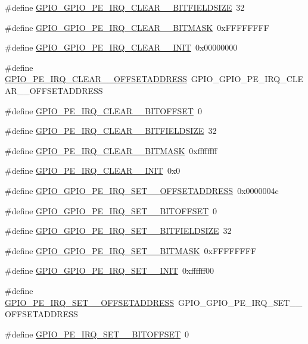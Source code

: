 \begin{DoxyCompactItemize}
\item 
\#define \hyperlink{a00553_a4c870e62898189fa92203f0682bbbe15}{GPIO\_\-GPIO\_\-PE\_\-IRQ\_\-CLEAR\_\_\-BITFIELDSIZE}~32
\item 
\#define \hyperlink{a00553_a793d4be1b9cbb0a63a60c5ee3d331065}{GPIO\_\-GPIO\_\-PE\_\-IRQ\_\-CLEAR\_\_\-BITMASK}~0xFFFFFFFF
\item 
\#define \hyperlink{a00553_af0caddaaadb1c9fd920fcbe4f42a7473}{GPIO\_\-GPIO\_\-PE\_\-IRQ\_\-CLEAR\_\_\-INIT}~0x00000000
\item 
\#define \hyperlink{a00553_a798229bf4e5ea0cc5f2be262d2c382d0}{GPIO\_\-PE\_\-IRQ\_\-CLEAR\_\_\-OFFSETADDRESS}~GPIO\_\-GPIO\_\-PE\_\-IRQ\_\-CLEAR\_\_\-OFFSETADDRESS
\item 
\#define \hyperlink{a00553_a2e8a8a33e6d9f1f2e9fec575e4bba0f7}{GPIO\_\-PE\_\-IRQ\_\-CLEAR\_\_\-BITOFFSET}~0
\item 
\#define \hyperlink{a00553_a4ac6e20dd0a129f61297428c6c927222}{GPIO\_\-PE\_\-IRQ\_\-CLEAR\_\_\-BITFIELDSIZE}~32
\item 
\#define \hyperlink{a00553_a22c7fca1e199d55d5dd87e368bc64a80}{GPIO\_\-PE\_\-IRQ\_\-CLEAR\_\_\-BITMASK}~0xffffffff
\item 
\#define \hyperlink{a00553_a157ca7bf58e28c816e92f3bb01b5f8e2}{GPIO\_\-PE\_\-IRQ\_\-CLEAR\_\_\-INIT}~0x0
\item 
\#define \hyperlink{a00553_a9157f2d5bf47dda85aeae4489ccd9413}{GPIO\_\-GPIO\_\-PE\_\-IRQ\_\-SET\_\_\-OFFSETADDRESS}~0x0000004c
\item 
\#define \hyperlink{a00553_a1e8be9676dc55a821f054b4a31d8fdb3}{GPIO\_\-GPIO\_\-PE\_\-IRQ\_\-SET\_\_\-BITOFFSET}~0
\item 
\#define \hyperlink{a00553_a4e96a3af7407cb3f1bc03dab1bf17b2f}{GPIO\_\-GPIO\_\-PE\_\-IRQ\_\-SET\_\_\-BITFIELDSIZE}~32
\item 
\#define \hyperlink{a00553_a40351041f556872478184a23025be5cc}{GPIO\_\-GPIO\_\-PE\_\-IRQ\_\-SET\_\_\-BITMASK}~0xFFFFFFFF
\item 
\#define \hyperlink{a00553_a9147f771ef88db18ec6530a57b8a6ebb}{GPIO\_\-GPIO\_\-PE\_\-IRQ\_\-SET\_\_\-INIT}~0xffffff00
\item 
\#define \hyperlink{a00553_a67d47283d969b2660f85e7921aa9d965}{GPIO\_\-PE\_\-IRQ\_\-SET\_\_\-OFFSETADDRESS}~GPIO\_\-GPIO\_\-PE\_\-IRQ\_\-SET\_\_\-OFFSETADDRESS
\item 
\#define \hyperlink{a00553_ad5ba0d946b7a6cf2e79abae9ef29823e}{GPIO\_\-PE\_\-IRQ\_\-SET\_\_\-BITOFFSET}~0
\item 

\end{DoxyCompactItemize}
